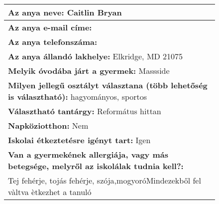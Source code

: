 \documentclass[10pt,a4paper]{article}
\begin{document}
\begin{figure}[!ht]
\begin{tabular}{|m{\textwidth}|}
\hline\vspace{3pt}
\textbf{Az anya neve:} \hspace{0.5cm} Caitlin Bryan \vspace{3pt} \\
\hline\vspace{3pt}
\textbf{Az anya e-mail címe:} \hspace{0.5cm}   \vspace{3pt} \\
\hline\vspace{3pt}
\textbf{Az anya telefonszáma:} \hspace{0.5cm}  \vspace{3pt} \\
\hline\vspace{3pt}
\textbf{Az anya állandó lakhelye:} \hspace{0.5cm} Elkridge, MD 21075 \vspace{3pt} \\
\hline\vspace{3pt}
\textbf{Melyik óvodába járt a gyermek:} \hspace{0.5cm} Massside \vspace{3pt} \\
\hline\vspace{3pt}
\textbf{Milyen jellegű osztályt választana (több lehetőség is választható):} \hspace{0.5cm} hagyományos, sportos \vspace{3pt} \\
\hline\vspace{3pt}
\textbf{Választható tantárgy:} \hspace{0.5cm} Református hittan \vspace{3pt} \\
\hline\vspace{3pt}
\textbf{Napköziotthon:} \hspace{0.5cm} Nem \vspace{3pt} \\
\hline\vspace{3pt}
\textbf{Iskolai étkeztetésre igényt tart:} \hspace{0.5cm} Igen \vspace{3pt} \\
\hline\vspace{3pt}
\textbf{Van a gyermekének allergiája, vagy más betegsége, melyről az iskolálak tudnia kell?:} \\ \hspace{0.5cm} Tej fehérje, tojás fehérje, szója,mogyoróMindezekből fel vàltva ètkezhet a tanuló \vspace{3pt} \\

\end{tabular}
\end{figure}
\end{document}
